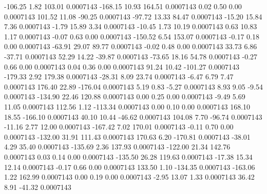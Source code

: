      -106.25        1.82      103.01     0.0007143
     -168.15       10.93      164.51     0.0007143
        0.02        0.50        0.00     0.0007143
      101.52       11.08      -90.25     0.0007143
      -97.72       13.33       84.47     0.0007143
      -15.20       15.84        7.36     0.0007143
       -1.79       15.89        3.34     0.0007143
      -10.45        1.73       10.19     0.0007143
        0.63       10.83        1.17     0.0007143
       -0.07        0.63        0.00     0.0007143
     -150.52        6.54      153.07     0.0007143
       -0.17        0.18        0.00     0.0007143
      -63.91       29.07       89.77     0.0007143
       -0.02        0.48        0.00     0.0007143
       33.73        6.86      -37.71     0.0007143
       52.29       14.22      -39.87     0.0007143
      -73.65       18.16       54.78     0.0007143
       -0.27        0.66        0.00     0.0007143
        0.04        0.36        0.00     0.0007143
       91.24       10.42     -101.27     0.0007143
     -179.33        2.92      179.38     0.0007143
      -28.31        8.09       23.74     0.0007143
       -6.47        6.79        7.47     0.0007143
      176.40       22.89     -176.04     0.0007143
        5.19        0.83       -5.27     0.0007143
        8.93        9.05       -9.54     0.0007143
     -134.90       22.46      120.88     0.0007143
        0.00        0.25        0.00     0.0007143
       -9.49        5.69       11.05     0.0007143
      112.56        1.12     -113.34     0.0007143
        0.00        0.10        0.00     0.0007143
      168.10       18.55     -166.10     0.0007143
       40.10       10.44      -46.62     0.0007143
      104.08        7.70      -96.74     0.0007143
      -11.16        2.77       12.00     0.0007143
     -167.42        7.02      170.01     0.0007143
       -0.11        0.70        0.00     0.0007143
     -132.00       31.91      111.43     0.0007143
      170.63        6.20     -170.81     0.0007143
      -38.01        4.29       35.40     0.0007143
     -135.69        2.36      137.93     0.0007143
     -122.00       21.34      142.76     0.0007143
        0.03        0.14        0.00     0.0007143
     -135.50       26.28      119.63     0.0007143
      -17.38       15.34       12.14     0.0007143
       -0.17        0.66        0.00     0.0007143
      133.50        1.10     -134.35     0.0007143
     -163.06        1.22      162.99     0.0007143
        0.00        0.19        0.00     0.0007143
       -2.95       13.07        1.33     0.0007143
       36.42        8.91      -41.32     0.0007143
